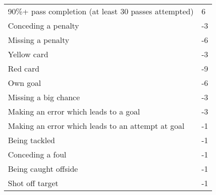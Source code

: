 \begin{table}[H]
\begin{tabular}{|l|l|}
90\%+ pass completion (at least 30 passes attempted)                     & 6   \\
Conceding a penalty                                                      & -3  \\
Missing a penalty                                                        & -6  \\
Yellow card                                                              & -3  \\
Red card                                                                 & -9  \\
Own goal                                                                 & -6  \\
Missing a big chance                                                     & -3  \\
Making an error which leads to a goal                                    & -3  \\
Making an error which leads to an attempt at goal                        & -1  \\
Being tackled                                                            & -1  \\
Conceding a foul                                                         & -1  \\
Being caught offside                                                     & -1  \\
Shot off target                                                          & -1 \\
\hline
\end{tabular}
\end{table}